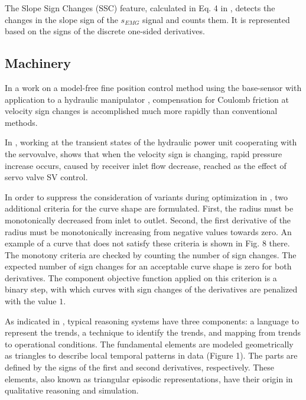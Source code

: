 \documentclass[11pt]{book}
\begin{document}
The Slope Sign Changes (SSC) feature, calculated in Eq. 4 in \cite{hassan2020teleoperated},
detects the changes in the slope sign of the $s_{EMG}$ signal and
counts them. It is represented based on the signs of the discrete
one-sided derivatives.


\subsection{Machinery}

In a work on a model-free fine position
control method using the base-sensor with application to a hydraulic manipulator \cite{iagnemma1997model}, compensation for Coulomb friction at velocity sign changes
is accomplished much more rapidly than conventional methods.

In \cite{korzeniowski2008investigation}, working at the transient states of the hydraulic power unit cooperating with the servovalve, shows that when the velocity sign
is changing, rapid pressure increase occurs, caused by receiver inlet
flow decrease, reached as the effect of servo valve SV control.

In order to suppress the consideration of variants during optimization
in \cite{tsalicoglou2010design}, two additional criteria for the
curve shape are formulated. First, the radius must be monotonically
decreased from inlet to outlet. Second, the first derivative of the
radius must be monotonically increasing from negative values towards
zero. An example of a curve that does not satisfy these criteria is
shown in Fig. 8 there. The monotony criteria are checked by counting
the number of sign changes. The expected number of sign changes for
an acceptable curve shape is zero for both derivatives. The component
objective function applied on this criterion is a binary step, with
which curves with sign changes of the derivatives are penalized with
the value $1$.

As indicated in \cite{juuso2011intelligent}, typical reasoning systems
have three components: a language to represent the trends, a technique
to identify the trends, and mapping from trends to operational conditions.
The fundamental elements are modeled geometrically as triangles to
describe local temporal patterns in data (Figure 1). The parts are
defined by the signs of the first and second derivatives, respectively.
These elements, also known as triangular episodic representations,
have their origin in qualitative reasoning and simulation.
\end{document}
